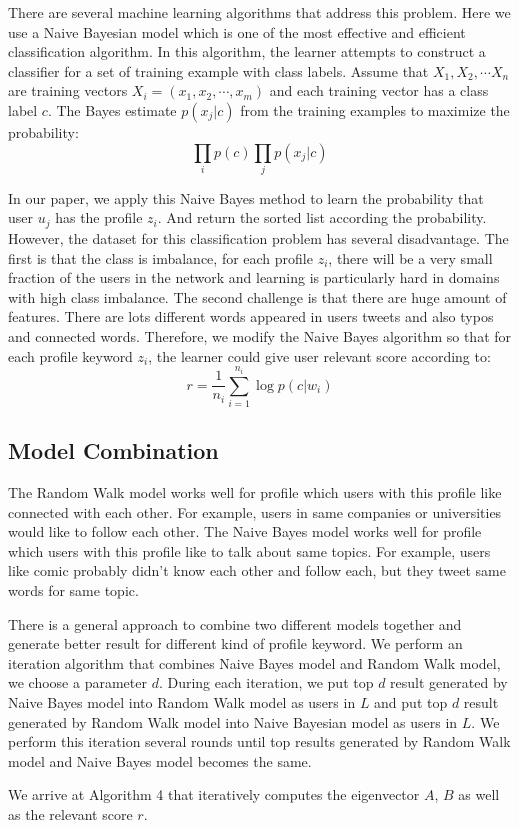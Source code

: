 \documentclass{article}
\begin{document}
There are several machine learning algorithms that address this problem. Here we use a Naive Bayesian model which is one of the most effective and efficient classification algorithm. In this algorithm, the learner attempts to construct a classifier for a set of training example with class labels. Assume that $X_1, X_2, \cdots X_n$ are training vectors $X_i=(x_1, x_2, \cdots, x_m)$ and each training vector has a class label $c$. The Bayes estimate $p(x_j|c)$ from the training examples to maximize the probability:
$$\prod_i p(c)\prod_jp(x_j|c)$$

In our paper, we apply this Naive Bayes method to learn the probability that user $u_j$ has the profile $z_i$. And return the sorted list according the probability.
However, the dataset for this classification problem has several disadvantage. The first is that the class is imbalance, for each profile $z_i$, there will be a very small fraction of the users in the network and learning is particularly hard in domains with high class imbalance. The second challenge is that there are huge amount of features. There are lots different words appeared in users tweets and also typos and connected words. Therefore, we modify the Naive Bayes algorithm so that for each profile keyword $z_i$, the learner could give user relevant score according to:
$$r = \frac{1}{n_i}\sum_{i=1}^{n_i} \log p(c|w_i)$$

\subsection{Model Combination}
The Random Walk model works well for profile which users with this profile like connected with each other. For example, users in same companies or universities would like to follow each other. The Naive Bayes model works well for profile which users with this profile like to talk about same topics. For example, users like comic probably didn't know each other and follow each, but they tweet same words for same topic.

There is a general approach to combine two different models together and generate better result for different kind of profile keyword.
We perform an iteration algorithm that combines Naive Bayes model and Random Walk model, we choose a parameter $d$. During each iteration, we put top $d$ result generated by Naive Bayes model into Random Walk model as users in $L$ and put top $d$ result generated by Random Walk model into Naive Bayesian model as users in $L$. We perform this iteration several rounds until top results generated by Random Walk model and Naive Bayes model becomes the same.

We arrive at Algorithm 4 that iteratively computes the eigenvector $A$, $B$ as well as the relevant score $r$.

\ifx \allfiles \undefined
\end{document}
